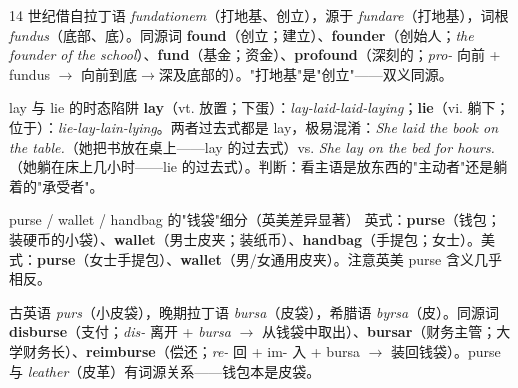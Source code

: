 \documentclass[../main.tex]{subfiles}
\begin{document}
\begin{origin}
14 世纪借自拉丁语 \textit{fundationem}（打地基、创立），源于 \textit{fundare}（打地基），词根 \textit{fundus}（底部、底）。同源词 \textbf{found}（创立；建立）、\textbf{founder}（创始人；\textit{the founder of the school}）、\textbf{fund}（基金；资金）、\textbf{profound}（深刻的；\textit{pro-} 向前 + fundus $\to$ 向前到底$\to$深及底部的）。"打地基"是"创立"——双义同源。
\end{origin}



\begin{gram}{lay 与 lie 的时态陷阱}
\textbf{lay}（vt. 放置；下蛋）：\textit{lay-laid-laid-laying}；\textbf{lie}（vi. 躺下；位于）：\textit{lie-lay-lain-lying}。两者过去式都是 lay，极易混淆：\textit{She laid the book on the table.}（她把书放在桌上——lay 的过去式）vs. \textit{She lay on the bed for hours.}（她躺在床上几小时——lie 的过去式）。判断：看主语是放东西的"主动者"还是躺着的"承受者"。
\end{gram}




\begin{lex}{purse / wallet / handbag 的"钱袋"细分（英美差异显著）}
英式：\textbf{purse}（钱包；装硬币的小袋）、\textbf{wallet}（男士皮夹；装纸币）、\textbf{handbag}（手提包；女士）。美式：\textbf{purse}（女士手提包）、\textbf{wallet}（男/女通用皮夹）。注意英美 purse 含义几乎相反。
\end{lex}

\begin{origin}
古英语 \textit{purs}（小皮袋），晚期拉丁语 \textit{bursa}（皮袋），希腊语 \textit{byrsa}（皮）。同源词 \textbf{disburse}（支付；\textit{dis-} 离开 + \textit{bursa} $\to$ 从钱袋中取出）、\textbf{bursar}（财务主管；大学财务长）、\textbf{reimburse}（偿还；\textit{re-} 回 + im- 入 + bursa $\to$ 装回钱袋）。purse 与 \textit{leather}（皮革）有词源关系——钱包本是皮袋。
\end{origin}
\end{document}
